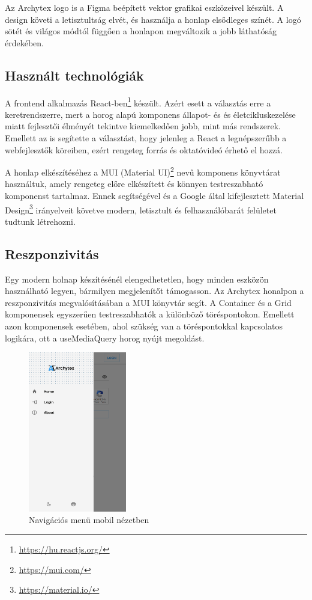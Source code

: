 Az Archytex logo is a Figma beépített vektor grafikai eszközeivel készült. A design követi a letisztultság elvét, és használja a honlap elsődleges színét. A logó sötét és világos módtól függően a honlapon megváltozik a jobb láthatóság érdekében.

\subsection{Használt technológiák}
A frontend alkalmazás React-ben\footnote{\url{https://hu.reactjs.org/}} készült. Azért esett a választás erre a keretrendszerre, mert a horog alapú komponens állapot- és és életcikluskezelése miatt fejlesztői élményét tekintve kiemelkedően jobb, mint más rendszerek. Emellett az is segítette a választást, hogy jelenleg a React a legnépszerűbb a webfejlesztők köreiben\cite{most-used-web-frameworks}, ezért rengeteg forrás és oktatóvideó érhető el hozzá.

A honlap elkészítéséhez a MUI (Material UI)\footnote{\url{https://mui.com/}} nevű komponens könyvtárat használtuk, amely rengeteg előre elkészített és könnyen testreszabható komponenst tartalmaz. Ennek segítségével és a Google által kifejlesztett Material Design\footnote{\url{https://material.io/}} irányelveit követve modern, letisztult és felhasználóbarát felületet tudtunk létrehozni.

\subsection{Reszponzivitás}
Egy modern holnap készítésénél elengedhetetlen, hogy minden eszközön használható legyen, bármilyen megjelenítőt támogasson. Az Archytex honalpon a reszponzivitás megvalósításában a MUI könyvtár segít. A Container és a Grid komponensek egyszerűen testreszabhatók a különböző töréspontokon. Emellett azon komponensek esetében, ahol szükség van a töréspontokkal kapcsolatos logikára, ott a useMediaQuery horog nyújt megoldást.

\begin{figure}[h]
  \centering
  \includegraphics[height=7cm]{parts/developer-documentation/frontend/images/mobile-view.png}
  \caption{Navigációs menü mobil nézetben}
\end{figure}

